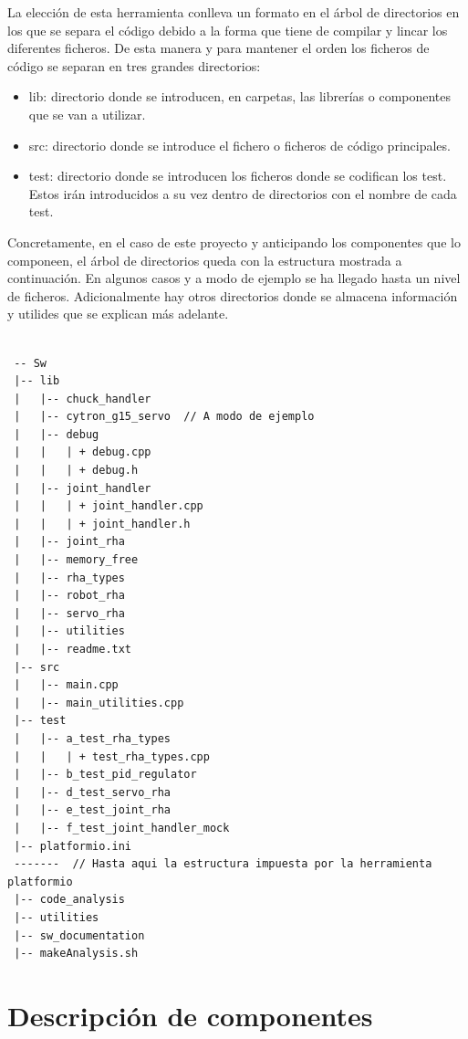 La elección de esta herramienta conlleva un formato en el árbol de directorios en los que se separa el código debido a la forma que tiene de compilar y lincar los diferentes ficheros. De esta manera y para mantener el orden los ficheros de código se separan en tres grandes directorios:

\begin{itemize}
    \item lib: directorio donde se introducen, en carpetas, las librerías o componentes que se van a utilizar.
    \item src: directorio donde se introduce el fichero o ficheros de código principales.
    \item test: directorio donde se introducen los ficheros donde se codifican los test. Estos irán introducidos a su vez dentro de directorios con el nombre de cada test.
\end{itemize}

Concretamente, en el caso de este proyecto y anticipando los componentes que lo componeen, el árbol de directorios queda con la  estructura mostrada a continuación. En algunos casos y a modo de ejemplo se ha llegado hasta un nivel de ficheros. Adicionalmente hay otros directorios donde se almacena información y utilides que se explican más adelante.

\lstset{language=C, breaklines=true, basicstyle=\footnotesize}
    \begin{lstlisting}[frame=single]

 -- Sw
 |-- lib
 |   |-- chuck_handler
 |   |-- cytron_g15_servo  // A modo de ejemplo
 |   |-- debug
 |   |   | + debug.cpp
 |   |   | + debug.h
 |   |-- joint_handler
 |   |   | + joint_handler.cpp
 |   |   | + joint_handler.h
 |   |-- joint_rha
 |   |-- memory_free
 |   |-- rha_types
 |   |-- robot_rha
 |   |-- servo_rha
 |   |-- utilities
 |   |-- readme.txt
 |-- src
 |   |-- main.cpp
 |   |-- main_utilities.cpp
 |-- test
 |   |-- a_test_rha_types
 |   |   | + test_rha_types.cpp
 |   |-- b_test_pid_regulator
 |   |-- d_test_servo_rha
 |   |-- e_test_joint_rha
 |   |-- f_test_joint_handler_mock
 |-- platformio.ini
 -------  // Hasta aqui la estructura impuesta por la herramienta platformio
 |-- code_analysis
 |-- utilities
 |-- sw_documentation
 |-- makeAnalysis.sh
    \end{lstlisting}

\section{Descripción de componentes} \label{sec:SW:descripcion_componentes}

